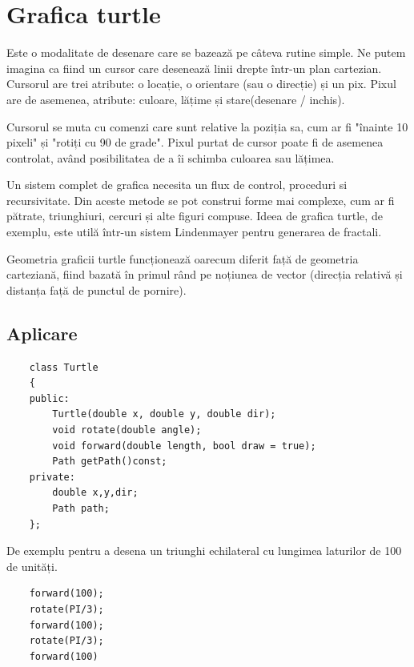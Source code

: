 \newpage
\section{Grafica turtle}

Este o modalitate de desenare care se bazează pe câteva rutine simple. Ne putem imagina ca fiind un cursor care desenează 
linii drepte într-un plan cartezian. Cursorul are trei atribute: o locație, o orientare (sau o direcție) și un pix. 
Pixul are de asemenea, atribute: culoare, lățime și stare(desenare / inchis).\newline

Cursorul se muta cu comenzi care sunt relative la poziția sa, cum ar fi "înainte 10 pixeli" și "rotiți cu 90 de grade". 
Pixul purtat de cursor poate fi de asemenea controlat, având posibilitatea de a îi schimba culoarea sau lățimea.\newline

Un sistem complet de grafica necesita un flux de control, proceduri si recursivitate. Din aceste metode se pot construi forme mai complexe, cum ar fi pătrate, triunghiuri, cercuri și alte figuri compuse. 
Ideea de grafica turtle, de exemplu, este utilă într-un sistem Lindenmayer pentru generarea de fractali.\newline

Geometria graficii turtle funcționează oarecum diferit față de geometria carteziană, 
fiind bazată în primul rând pe noțiunea de vector (direcția relativă și distanța față de punctul de pornire). \cite{turtle2}\newline

\subsection{Aplicare}

\lstset{language=C++}
\begin{lstlisting}
    class Turtle
    {
    public:
        Turtle(double x, double y, double dir);
        void rotate(double angle);
        void forward(double length, bool draw = true);
        Path getPath()const;
    private:
        double x,y,dir;
        Path path;
    };
\end{lstlisting}

De exemplu pentru a desena un triunghi echilateral cu lungimea laturilor de 100 de unități.\cite{turtle}

\lstset{language=C++}
\begin{lstlisting}
    forward(100);
    rotate(PI/3);
    forward(100);
    rotate(PI/3);
    forward(100)
\end{lstlisting}

